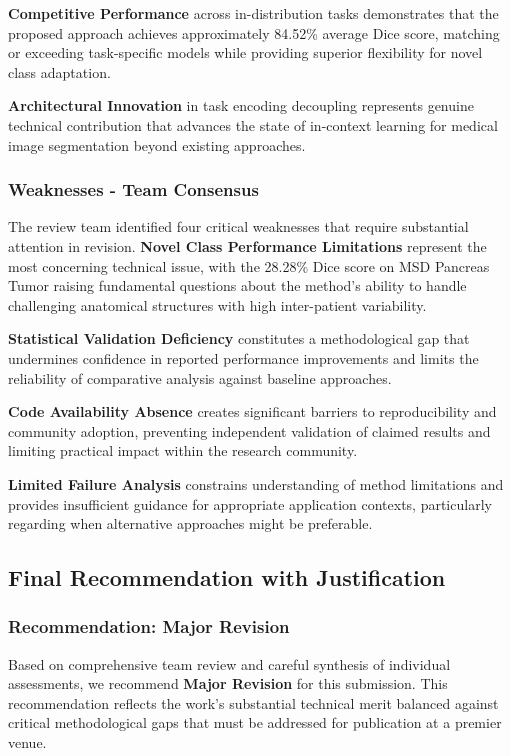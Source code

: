 \textbf{Competitive Performance} across in-distribution tasks demonstrates that the proposed approach achieves approximately 84.52\% average Dice score, matching or exceeding task-specific models while providing superior flexibility for novel class adaptation.

\textbf{Architectural Innovation} in task encoding decoupling represents genuine technical contribution that advances the state of in-context learning for medical image segmentation beyond existing approaches.

\subsubsection{Weaknesses - Team Consensus}
The review team identified four critical weaknesses that require substantial attention in revision. \textbf{Novel Class Performance Limitations} represent the most concerning technical issue, with the 28.28\% Dice score on MSD Pancreas Tumor raising fundamental questions about the method's ability to handle challenging anatomical structures with high inter-patient variability.

\textbf{Statistical Validation Deficiency} constitutes a methodological gap that undermines confidence in reported performance improvements and limits the reliability of comparative analysis against baseline approaches.

\textbf{Code Availability Absence} creates significant barriers to reproducibility and community adoption, preventing independent validation of claimed results and limiting practical impact within the research community.

\textbf{Limited Failure Analysis} constrains understanding of method limitations and provides insufficient guidance for appropriate application contexts, particularly regarding when alternative approaches might be preferable.

\subsection{Final Recommendation with Justification}
\subsubsection{Recommendation: Major Revision}

Based on comprehensive team review and careful synthesis of individual assessments, we recommend \textbf{Major Revision} for this submission. This recommendation reflects the work's substantial technical merit balanced against critical methodological gaps that must be addressed for publication at a premier venue.

